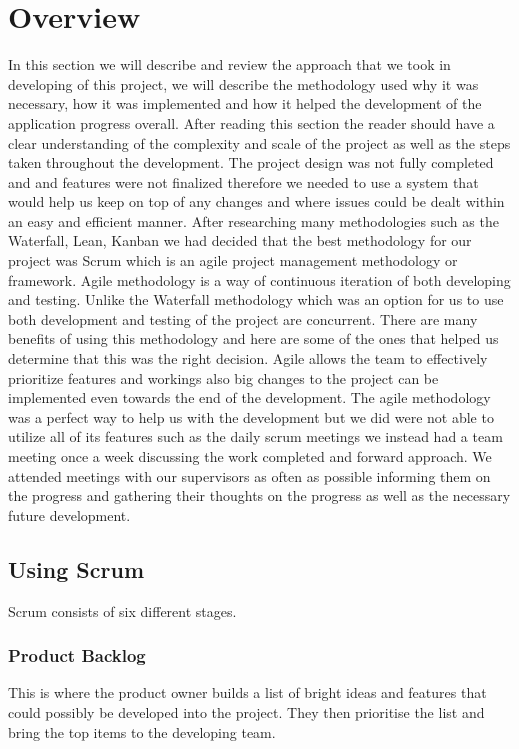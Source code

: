 \documentclass[a4paper,12pt]{report}
\begin{document}
\section{Overview}
In this section we will describe and review the approach that we took in developing of this project, we will describe the methodology used why it was necessary, how it was implemented and how it helped the development of the application progress overall.
After reading this section the reader should have a clear understanding of the complexity and scale of the project as well as the steps taken throughout the development.
The project design was not fully completed and and features were not finalized therefore we needed to use a system that would help us keep on top of any changes and where issues could be dealt within an easy and efficient manner.
After researching many methodologies such as the Waterfall, Lean, Kanban we had decided that the best methodology for our project was Scrum which is an agile project management methodology or framework.
Agile methodology is a way of continuous iteration of both developing and testing. Unlike the Waterfall methodology which was an option for us to use both development and testing of the project are concurrent. 
There are many benefits of using this methodology and here are some of the ones that helped us determine that this was the right decision.
Agile allows the team to effectively prioritize features and workings also big changes to the project can be implemented even towards the end of the development.\cite{agileResearch}
\newpage
The agile methodology was a perfect way to help us with the development but we did were not able to utilize all of its features such as the daily scrum meetings we instead had a team meeting once a week discussing the work completed and forward approach. We attended meetings with our supervisors as often as possible informing them on the progress and gathering their thoughts on the progress as well as the necessary future development.   

\subsection{Using Scrum}
Scrum consists of six different stages.
\subsubsection{Product Backlog}
This is where the product owner builds a list of bright ideas and features that could possibly be developed into the project.
They then prioritise the list and bring the top items to the developing team.
\end{document}
